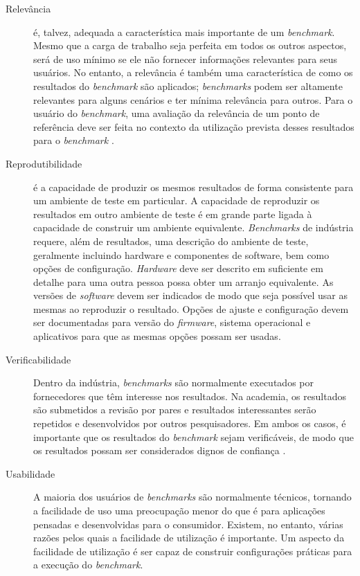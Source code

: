 \begin{description}
	\item[Relevância] é, talvez, adequada a característica mais importante de um \textit{benchmark}. Mesmo que a carga de trabalho seja perfeita em todos os outros aspectos, será de uso mínimo se ele não fornecer informações relevantes para seus usuários. No entanto, a relevância é também uma característica de como os resultados do \textit{benchmark} são aplicados; \textit{benchmarks} podem ser altamente relevantes para alguns cenários e ter mínima relevância para outros. Para o usuário do \textit{benchmark}, uma avaliação da relevância de um ponto de referência deve ser feita no contexto da utilização prevista desses resultados para o \textit{benchmark} \cite{Kistowski2015}. 
	
	\item[Reprodutibilidade] é a capacidade de produzir os mesmos resultados de forma consistente para um ambiente de teste em particular. A capacidade de reproduzir os resultados em outro ambiente de teste é em grande parte ligada à capacidade de construir um ambiente equivalente. \textit{Benchmarks} de indústria requere, além de resultados, uma descrição do ambiente de teste, geralmente incluindo hardware e componentes de software, bem como opções de configuração. \textit{Hardware} deve ser descrito em suficiente em detalhe para uma outra pessoa possa obter um arranjo equivalente. As versões de \textit{software} devem ser indicados de modo que seja possível usar as mesmas ao reproduzir o resultado. Opções de ajuste e configuração devem ser documentadas para versão do \textit{firmware}, sistema operacional e aplicativos para que as mesmas opções possam ser usadas. \cite{Kistowski2015}
	
	\item[Verificabilidade] Dentro da indústria, \textit{benchmarks} são normalmente executados por fornecedores que têm interesse nos resultados. Na academia, os resultados são submetidos a revisão por pares e resultados interessantes serão repetidos e desenvolvidos por outros pesquisadores. Em ambos os casos, é importante que os resultados do \textit{benchmark} sejam verificáveis, de modo que os resultados possam ser considerados dignos de confiança \cite{Kistowski2015}. 
	
	\item[Usabilidade] A maioria dos usuários de \textit{benchmarks} são normalmente técnicos, tornando a facilidade de uso uma preocupação menor do que é para aplicações pensadas e desenvolvidas para o consumidor. Existem, no entanto, várias razões pelos quais a facilidade de utilização é importante.
	Um aspecto da facilidade de utilização é ser capaz de construir configurações práticas para a execução do \textit{benchmark}. 
	

\end{description}
